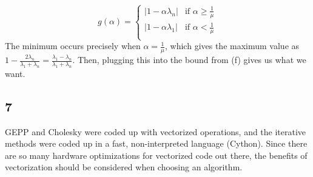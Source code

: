 \documentclass{article}
\begin{document}
\[
    g(\alpha)=\begin{cases}
        |1-\alpha\lambda_n|&\text{if }\alpha\geq\frac{1}{\mu}\\
        |1-\alpha\lambda_1|&\text{if }\alpha<\frac{1}{\mu}\\
    \end{cases}
\]
The minimum occurs precisely when $\alpha=\frac{1}{\mu}$, which gives the maximum value as $1-\frac{2\lambda_n}{\lambda_1+\lambda_n}=\frac{\lambda_1-\lambda_n}{\lambda_1+\lambda_n}$. Then, plugging this into the bound from (f) gives us what we want.
\subsection*{7}
GEPP and Cholesky were coded up with vectorized operations, and the iterative methods were coded up in a fast, non-interpreted language (Cython). Since there are so many hardware optimizations for vectorized code out there, the benefits of vectorization should be considered when choosing an algorithm.
\end{document}
